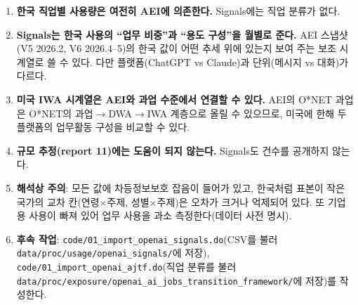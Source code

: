 \documentclass[11pt]{article}
\begin{document}
\begin{enumerate}[label=(\arabic*)]
  \item \textbf{한국 직업별 사용량은 여전히 AEI에 의존한다.} Signals에는 직업 분류가 없다.
  \item \textbf{Signals는 한국 사용의 ``업무 비중''과 ``용도 구성''을 월별로 준다.} AEI 스냅샷(V5 2026.2, V6 2026.4--5)의 한국 값이 어떤 추세 위에 있는지 보여 주는 보조 시계열로 쓸 수 있다. 다만 플랫폼(ChatGPT vs Claude)과 단위(메시지 vs 대화)가 다르다.
  \item \textbf{미국 IWA 시계열은 AEI와 과업 수준에서 연결할 수 있다.} AEI의 O*NET 과업은 O*NET의 과업$\to$DWA$\to$IWA 계층으로 올릴 수 있으므로, 미국에 한해 두 플랫폼의 업무활동 구성을 비교할 수 있다.
  \item \textbf{규모 추정(report 11)에는 도움이 되지 않는다.} Signals도 건수를 공개하지 않는다.
  \item \textbf{해석상 주의}: 모든 값에 차등정보보호 잡음이 들어가 있고, 한국처럼 표본이 작은 국가의 교차 칸(연령$\times$주제, 성별$\times$주제)은 오차가 크거나 억제되어 있다. 또 기업용 사용이 빠져 있어 업무 사용을 과소 측정한다(데이터 사전 명시).
  \item \textbf{후속 작업}: \texttt{code/01\_import\_openai\_signals.do}(CSV를 불러 \texttt{data/proc/usage/openai\_signals/}에 저장), \texttt{code/01\_import\_openai\_ajtf.do}(직업 분류를 불러 \texttt{data/proc/exposure/openai\_ai\_jobs\_transition\_framework/}에 저장)를 작성한다.
\end{enumerate}

\printbibliography[title={참고문헌}]
\end{document}
